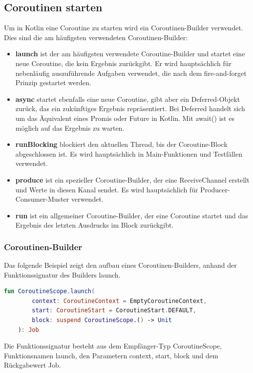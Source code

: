\documentclass[fontsize=12pt,paper=a4,twoside=semi,parskip=half-,headsepline,headinclude]{scrreprt}
\begin{document}
\subsection{Coroutinen starten}

Um in Kotlin eine Coroutine zu starten wird ein Coroutinen-Builder verwendet. Dies sind die am häufigsten verwendeten Coroutinen-Builder:

\begin{itemize}
	\item \textbf{launch} ist der am häufigsten verwendete Coroutine-Builder und startet eine neue Coroutine, die kein Ergebnis zurückgibt. Er wird hauptsächlich für nebenläufig auszuführende Aufgaben verwendet, die nach dem fire-and-forget Prinzip gestartet werden.
	\item \textbf{async} startet ebenfalls eine neue Coroutine, gibt aber ein Deferred-Objekt zurück, das ein zukünftiges Ergebnis repräsentiert. Bei Deferred handelt sich um das Äquivalent eines Promis oder Future in Kotlin. Mit await() ist es möglich auf das Ergebnis zu warten.
	\item \textbf{runBlocking} blockiert den aktuellen Thread, bis der Coroutine-Block abgeschlossen ist. Es wird hauptsächlich in Main-Funktionen und Testfällen verwendet.
	\item \textbf{produce} ist ein spezieller Coroutine-Builder, der eine ReceiveChannel erstellt und Werte in diesen Kanal sendet. Es wird hauptsächlich für Producer-Consumer-Muster verwendet.
	\item \textbf{run} ist ein allgemeiner Coroutine-Builder, der eine Coroutine startet und das Ergebnis des letzten Ausdrucks im Block zurückgibt.
\end{itemize}

\subsubsection{Coroutinen-Builder}

Das folgende Beispiel zeigt den aufbau eines Coroutinen-Builders, anhand der Funktionssignatur des Builders launch.

\begin{lstlisting}[language=Kotlin]
	fun CoroutineScope.launch(
		context: CoroutineContext = EmptyCoroutineContext,
		start: CoroutineStart = CoroutineStart.DEFAULT,
		block: suspend CoroutineScope.() -> Unit
	): Job
\end{lstlisting}

Die Funktionssignatur besteht aus dem Empfänger-Typ CoroutineScope, Funktionsnamen launch, den Parametern context, start, block und dem Rückgabewert Job.
\end{document}
